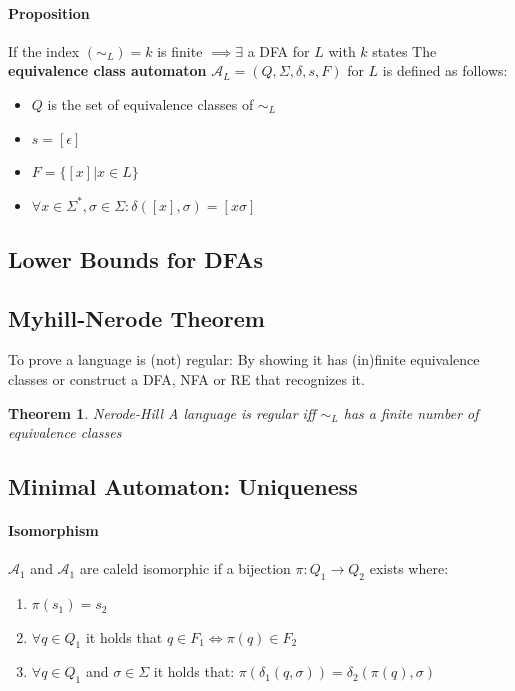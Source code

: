 \documentclass[a3paper, 8pt]{extarticle}
\newtheorem{theorem}{Theorem}[section]
\begin{document}
\begin{multicols*}{6}
\paragraph{Proposition} If the index $(\sim_L) = k$ is finite $\implies \exists$ a DFA for $L$ with $k$ states
The \textbf{equivalence class automaton} $\mathcal{A}_L = (Q,\Sigma, \delta, s, F)$ for $L$ is defined as follows:\begin{itemize}
    \item $Q$ is the set of equivalence classes of $\sim_L$
    \item $s = [\epsilon]$
    \item $F= \{[x] | x \in L\}$
    \item $\forall x \in \Sigma^*, \sigma \in \Sigma: \delta([x], \sigma) = [x \sigma]$
\end{itemize}


\subsection{Lower Bounds for DFAs} 
\subsection{Myhill-Nerode Theorem} 
To prove a language is (not) regular: By showing it has (in)finite equivalence classes or construct a DFA, NFA or RE that recognizes it. 
\begin{theorem}
    Nerode-Hill
    A language is regular iff $\sim_L$ has a finite number of equivalence classes
\end{theorem}


\subsection{Minimal Automaton: Uniqueness}

\paragraph{Isomorphism}
$\mathcal{A}_1$ and $\mathcal{A}_1$ are caleld isomorphic if a bijection $\pi: Q_1\to Q_2$ exists where:
\begin{enumerate}
    \item $\pi(s_1)=s_2$
    \item $\forall q \in Q_1$ it holds that $q \in F_1 \iff \pi(q) \in F_2$
    \item $\forall q \in Q_1$ and $\sigma \in \Sigma$ it holds that: $\pi(\delta_1(q,\sigma))=\delta_2(\pi(q),\sigma)$
\end{enumerate}

\end{multicols*}
\end{document}
